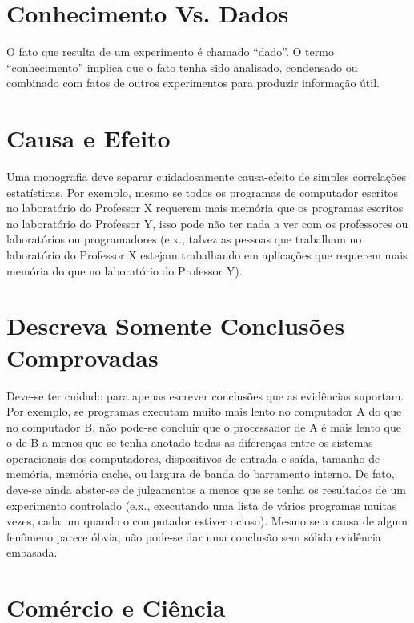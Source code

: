 \section{Conhecimento Vs. Dados}

O fato que resulta de um experimento \'{e} chamado ``dado''. 
O termo ``conhecimento'' implica que o fato tenha sido analisado, condensado ou combinado com fatos de outros experimentos para produzir informa\c{c}\~{a}o \'{u}til.

\section{Causa e Efeito}

Uma monografia deve separar cuidadosamente causa-efeito de simples correla\c{c}\~{o}es estat\'{i}sticas. Por exemplo, mesmo se todos os programas de computador escritos no laborat\'{o}rio do Professor X requerem mais mem\'{o}ria que os programas escritos no laborat\'{o}rio do Professor Y, isso pode n\~{a}o ter nada a ver com os professores ou laborat\'{o}rios ou programadores (e.x., talvez as pessoas que trabalham no laborat\'{o}rio do Professor X estejam trabalhando em aplica\c{c}\~{o}es que requerem mais mem\'{o}ria do que no laborat\'{o}rio do Professor Y).

\section{Descreva Somente Conclus\~{o}es Comprovadas}   		

Deve-se ter cuidado para apenas escrever conclus\~{o}es que as evidências suportam. Por exemplo, se programas executam muito mais lento no computador A do que no computador B, 
n\~{a}o pode-se concluir que o processador de A \'{e} mais lento que o de B a menos que se tenha anotado todas as diferen\c{c}as entre os sistemas operacionais dos computadores, dispositivos de entrada e sa\'{i}da, 
tamanho de mem\'{o}ria, mem\'{o}ria cache, ou largura de banda do barramento interno. 
De fato, deve-se ainda abster-se de julgamentos a menos que se tenha os resultados de um experimento controlado (e.x., executando uma lista de v\'{a}rios programas muitas vezes, cada um quando o computador 
estiver ocioso). Mesmo se a causa de algum fenômeno parece \'{o}bvia, n\~{a}o pode-se dar uma conclus\~{a}o sem s\'{o}lida evidência embasada.

\section{Com\'{e}rcio e Ciência}


